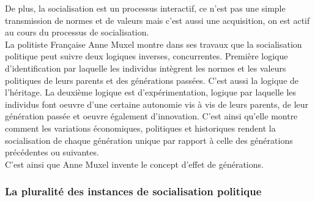 \documentclass[12pt, a4paper, openany]{book}
\begin{document}
De plus, la socialisation est un processus interactif, ce n'est pas une simple transmission de normes et de valeurs mais c'est aussi une acquisition, on est actif au cours du processus de socialisation. \\
La politiste Française Anne Muxel montre dans ses travaux que la socialisation politique peut suivre deux logiques inverses, concurrentes. Première logique d'identification par laquelle les individus intègrent les normes et les valeurs politiques de leurs parents et des générations passées. C'est aussi la logique de l'héritage. La deuxième logique est d'expérimentation, logique par laquelle les individus font oeuvre d'une certaine autonomie vis à vis de leurs parents, de leur génération passée et oeuvre également d'innovation. C'est ainsi qu'elle montre comment les variations économiques, politiques et historiques rendent la socialisation de chaque génération unique par rapport à celle des générations précédentes ou suivantes. \\
C'est ainsi que Anne Muxel invente le concept d'effet de générations. 


\subsubsection{La pluralité des instances de socialisation politique}
\end{document}
